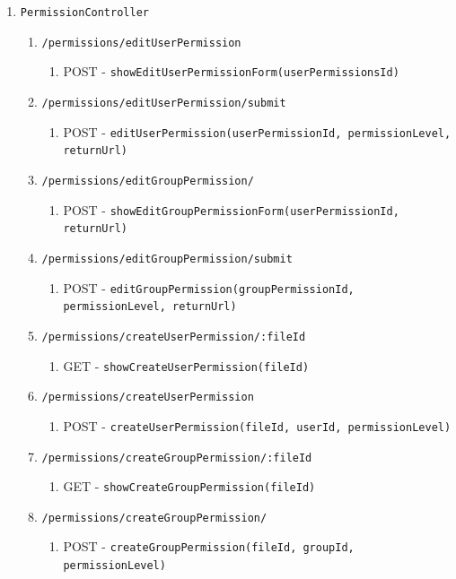 \documentclass[12pt,DIV14,BCOR10mm,a4paper,parskip=half-,headsepline,headinclude,english,ngerman,bibliography=totocnumbered]{scrreprt}
\begin{document}
\begin{enumerate}
\begin{enumerate}
    \item \texttt{PermissionController}
    \begin{enumerate}

      \item \texttt{/permissions/editUserPermission}
      \begin{enumerate}
        \item POST - \texttt{showEditUserPermissionForm(userPermissionsId)}
      \end{enumerate}
      \item \texttt{/permissions/editUserPermission/submit}
      \begin{enumerate}
        \item POST - \texttt{editUserPermission(userPermissionId, permissionLevel, returnUrl)}
      \end{enumerate}
      \item \texttt{/permissions/editGroupPermission/}
      \begin{enumerate}
        \item POST - \texttt{showEditGroupPermissionForm(userPermissionId, returnUrl)}
      \end{enumerate}
      \item \texttt{/permissions/editGroupPermission/submit}
      \begin{enumerate}
        \item POST - \texttt{editGroupPermission(groupPermissionId, permissionLevel, returnUrl)}
      \end{enumerate}

      \item \texttt{/permissions/createUserPermission/:fileId}
      \begin{enumerate}
        \item GET - \texttt{showCreateUserPermission(fileId)}
      \end{enumerate}
      \item \texttt{/permissions/createUserPermission}
      \begin{enumerate}
        \item POST - \texttt{createUserPermission(fileId, userId, permissionLevel)}
      \end{enumerate}
      \item \texttt{/permissions/createGroupPermission/:fileId}
      \begin{enumerate}
        \item GET - \texttt{showCreateGroupPermission(fileId)}
      \end{enumerate}
      \item \texttt{/permissions/createGroupPermission/}
      \begin{enumerate}
        \item POST - \texttt{createGroupPermission(fileId, groupId, permissionLevel)}
      \end{enumerate}
      

\end{enumerate}
\end{enumerate}
\end{enumerate}
\end{document}
